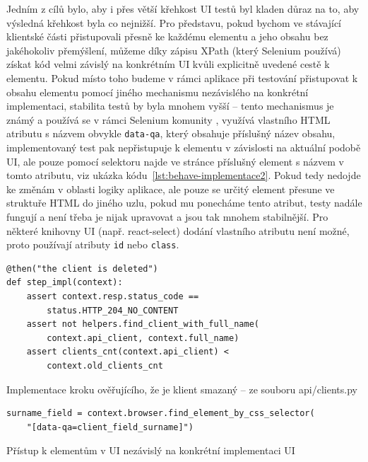 Jedním z cílů bylo, aby i přes větší křehkost UI testů byl kladen důraz na to, aby výsledná křehkost byla co nejnižší. Pro představu, pokud bychom ve stávající klientské části přistupovali přesně ke každému elementu a jeho obsahu bez jakéhokoliv přemýšlení, můžeme díky zápisu XPath (který Selenium používá) získat kód velmi závislý na konkrétním UI kvůli explicitně uvedené cestě k elementu. Pokud místo toho budeme v rámci aplikace při testování přistupovat k obsahu elementu pomocí jiného mechanismu nezávislého na konkrétní implementaci, stabilita testů by byla mnohem vyšší -- tento mechanismus je známý a používá se v rámci Selenium komunity \cite{dataqa}, využívá vlastního HTML atributu s názvem obvykle \verb|data-qa|, který obsahuje příslušný název obsahu, implementovaný test pak nepřistupuje k elementu v závislosti na aktuální podobě UI, ale pouze pomocí selektoru najde ve stránce příslušný element s názvem v tomto atributu, viz ukázka kódu~\ref{lst:behave-implementace2}. Pokud tedy nedojde ke změnám v oblasti logiky aplikace, ale pouze se určitý element přesune ve struktuře HTML do jiného uzlu, pokud mu ponecháme tento atribut, testy nadále fungují a není třeba je nijak upravovat a jsou tak mnohem stabilnější. Pro některé knihovny UI (např. react-select) dodání vlastního atributu není možné, proto používají atributy \verb|id| nebo \verb|class|.

\begin{listing}[ht]
	\begin{verbatim}
@then("the client is deleted")
def step_impl(context):
    assert context.resp.status_code == 
        status.HTTP_204_NO_CONTENT
    assert not helpers.find_client_with_full_name(
        context.api_client, context.full_name)
    assert clients_cnt(context.api_client) < 
        context.old_clients_cnt
	\end{verbatim}
	\caption{Implementace kroku ověřujícího, že je klient smazaný -- ze souboru api/clients.py}\label{lst:behave-implementace}
\end{listing}

\begin{listing}[ht]
	\begin{verbatim}
surname_field = context.browser.find_element_by_css_selector(
    "[data-qa=client_field_surname]")
	\end{verbatim}
	\caption{Přístup k elementům v UI nezávislý na konkrétní implementaci UI}\label{lst:behave-implementace2}
\end{listing}

